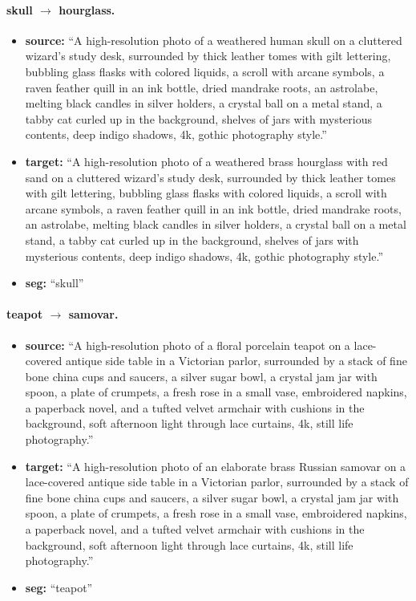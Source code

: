 \paragraph{skull $\to$ hourglass.}
\begin{itemize}
    \item \textbf{source:} ``A high-resolution photo of a weathered human skull on a cluttered wizard's study desk, surrounded by thick leather tomes with gilt lettering, bubbling glass flasks with colored liquids, a scroll with arcane symbols, a raven feather quill in an ink bottle, dried mandrake roots, an astrolabe, melting black candles in silver holders, a crystal ball on a metal stand, a tabby cat curled up in the background, shelves of jars with mysterious contents, deep indigo shadows, 4k, gothic photography style.''
    \item \textbf{target:} ``A high-resolution photo of a weathered brass hourglass with red sand on a cluttered wizard's study desk, surrounded by thick leather tomes with gilt lettering, bubbling glass flasks with colored liquids, a scroll with arcane symbols, a raven feather quill in an ink bottle, dried mandrake roots, an astrolabe, melting black candles in silver holders, a crystal ball on a metal stand, a tabby cat curled up in the background, shelves of jars with mysterious contents, deep indigo shadows, 4k, gothic photography style.''
    \item \textbf{seg:} ``skull''
\end{itemize}

\paragraph{teapot $\to$ samovar.}
\begin{itemize}
    \item \textbf{source:} ``A high-resolution photo of a floral porcelain teapot on a lace-covered antique side table in a Victorian parlor, surrounded by a stack of fine bone china cups and saucers, a silver sugar bowl, a crystal jam jar with spoon, a plate of crumpets, a fresh rose in a small vase, embroidered napkins, a paperback novel, and a tufted velvet armchair with cushions in the background, soft afternoon light through lace curtains, 4k, still life photography.''
    \item \textbf{target:} ``A high-resolution photo of an elaborate brass Russian samovar on a lace-covered antique side table in a Victorian parlor, surrounded by a stack of fine bone china cups and saucers, a silver sugar bowl, a crystal jam jar with spoon, a plate of crumpets, a fresh rose in a small vase, embroidered napkins, a paperback novel, and a tufted velvet armchair with cushions in the background, soft afternoon light through lace curtains, 4k, still life photography.''
    \item \textbf{seg:} ``teapot''
\end{itemize}

